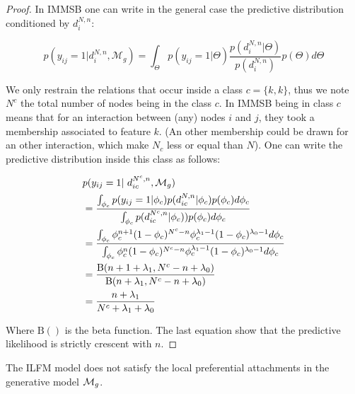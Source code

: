 \begin{proof}
In IMMSB one can write in the general case the predictive distribution conditioned by $d_i^{N,n}$:

\begin{equation} 
p(y_{ij} = 1 | d_i^{N,n}, \mathcal{M}_g) = \int_{\Theta} p(y_{ij}=1|\Theta) \frac{p(d_i^{N,n} | \Theta)}{p(d_i^{N,n})} p(\Theta) d\Theta \nonumber
\end{equation}

We only restrain the relations that occur inside a class $c=\{k,k\}$, thus we note $N^c$ the total number of nodes being in the class $c$. In IMMSB being in class $c$ means that for an interaction between (any) nodes $i$ and $j$, they took a membership associated to feature $k$.   (An other membership could be drawn for an other interaction, which make $N_c$ less or equal than $N$). One can write the predictive distribution inside this class as follows:

\begin{align*} \label{eq:sum}
&p(y_{ij} = 1 | d_{ic}^{N^c,n}, \mathcal{M}_g)  \\
&=  \frac{ \int_{\phi_{c}} p(y_{ij}=1|\phi_{c}) p(d_{ic}^{N,n} | \phi_{c}) p(\phi_{c}) d\phi_{c}}{\int_{\phi_{c}} \p(d_{ic}^{N^c,n} | \phi_{c}))       p(\phi_{c}) d\phi_{c}}   \\
&= \frac{\int_{\phi_c} \phi_c^{n+1}(1-\phi_c)^{N^c-n} \phi_c^{\lambda_1-1} (1-\phi_c)^{\lambda_0-1} d\phi_{c}}{\int_{\phi_c} \phi_c^{n}(1-\phi_c)^{N^c-n} \phi_c^{\lambda_1-1} (1-\phi_c)^{\lambda_0-1} d\phi_{c}} \\
&= \frac{ \text{B}(n+1+\lambda_1, N^c-n+\lambda_0) }{\text{B}(n+\lambda_1, N^c-n+\lambda_0)} \\
&= \frac{n+\lambda_1}{N^c + \lambda_1 +\lambda_0}
\end{align*}

Where $\text{B}()$ is the beta function. The last equation show that the predictive likelihood is strictly crescent with $n$.

\end{proof}

\begin{proposition}
	The ILFM model does not satisfy the local preferential attachments in the generative model $\mathcal{M}_g$.
\end{proposition}

